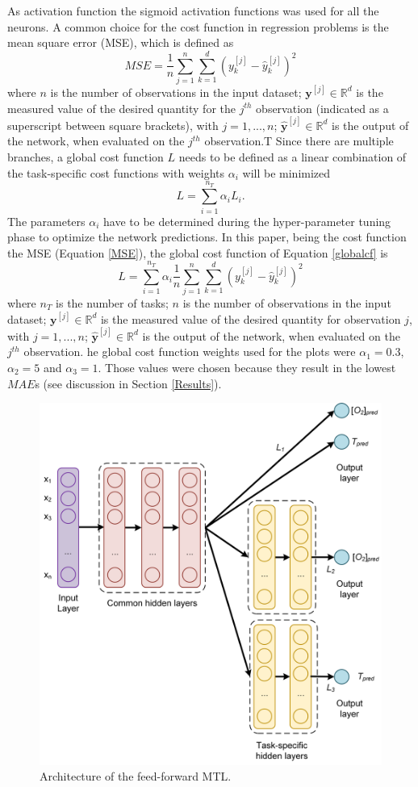 \documentclass[9pt,twocolumn,twoside,pdftex]{optica}
\begin{document}
As activation function the sigmoid activation functions was used for all the neurons. A common choice for the cost function in regression problems is the mean square error (MSE), which is defined as
\begin{equation}
MSE = \frac{1}{n}\sum_{j=1}^n \sum_{k=1}^d (y_k^{[j]}-\hat y_k^{[j]})^2
\label{MSE}
\end{equation}
where $n$ is the number of observations in the input dataset; ${\mathbold y}^{[j]} \in \mathbb{R}^d$ is the measured value of the desired quantity for the $j^{th}$ observation (indicated as a superscript between square brackets), with $j=1, ..., n$; $ \hat {\mathbold y}^{[j]} \in \mathbb{R}^d$ is the output of the network, when evaluated on the $j^{th}$ observation.T Since there are multiple branches, a global cost function $L$ needs to be defined as a linear combination of the task-specific cost functions with weights $\alpha_i$ will be minimized
\begin{equation}
L = \sum_{i=1}^{n_T}\alpha_i L_i .
\label{globalcf}
\end{equation}
The parameters $\alpha_i$ have to be determined during the hyper-parameter tuning phase to optimize the network predictions.
In this paper, being the cost function the MSE (Equation \ref{MSE}), the global cost function of Equation \ref{globalcf} is
\begin{equation}
L = \sum_{i=1}^{n_T}\alpha_i \frac{1}{n}\sum_{j=1}^n \sum_{k=1}^d (y_k^{[j]}-\hat y_k^{[j]})^2
\end{equation}
where  $n_T$ is the number of tasks; $n$ is the number of observations in the input dataset; ${\mathbold y}^{[j]} \in \mathbb{R}^d$ is the measured value of the desired quantity for observation $j$, with $j=1, ..., n$; $ \hat {\mathbold y}^{[j]} \in \mathbb{R}^d$ is the output of the network, when evaluated on the $j^{th}$ observation.
he global cost function weights used for the plots were $\alpha_1 = 0.3$, $\alpha_2 = 5$ and $\alpha_3 = 1$. Those values were chosen because they result in the lowest $MAE$s (see discussion in Section \ref{Results}).
 
\begin{figure}[htbp]
\centering
\includegraphics[width=9 cm]{NN_MTL_O2_T.png}
\caption{Architecture of the feed-forward MTL.}
\label{fig:NN_MTL_O2_T}
\end{figure}
\end{document}
